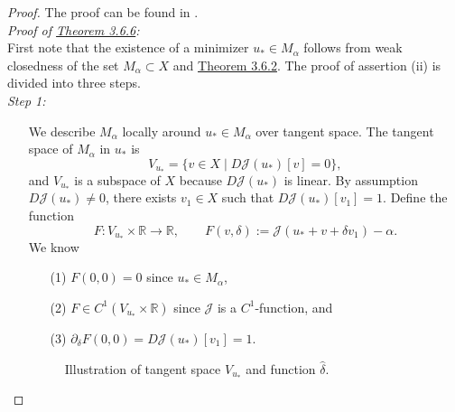 \begin{proof}
The proof can be found in \cite[Kapitel III, III.5 Differentiation nichtlinearer Abbildungen, Satz III.5.4 (e)]{dirk_werner}.\\[11pt]

\textit{Proof of \hyperlink{theorem_3_6_6}{Theorem 3.6.6}:}\\
First note that the existence of a minimizer $u_*\in M_\alpha$ follows from weak closedness of the set $M_\alpha\subset X$ and \hyperlink{theorem_3_6_2}{Theorem 3.6.2}. The proof of assertion (ii) is divided into three steps.\\

\textit{Step 1:}
\begin{itemize}
	\item[] We describe $M_\alpha$ locally around $u_*\in M_\alpha$ over tangent space. The tangent space of $M_\alpha$ in $u_*$ is
	\[V_{u_*}=\{v\in X\mid D\mathcal{J}(u_*)[v]=0\},\]
	and $V_{u_*}$ is a subspace of $X$ because $D\mathcal{J}(u_*)$ is linear. By assumption $D\mathcal{J}(u_*)\ne0$, there exists $v_1\in X$ such that $D\mathcal{J}(u_*)[v_1]=1$. Define the function
	\[F:V_{u_*}\times\mathbb{R}\longrightarrow\mathbb{R},\qquad F(v,\delta):=\mathcal{J}(u_*+v+\delta v_1)-\alpha.\]
	We know
	\begin{itemize}
		\item[(1)] $F(0,0)=0$ since $u_*\in M_\alpha$,
		\item[(2)] $F\in C^1(V_{u_*}\times\mathbb{R})$ since $\mathcal{J}$ is a $C^1$-function, and
		\item[(3)] $\partial_\delta F(0,0)=D\mathcal{J}(u_*)[v_1]=1$.
	\end{itemize}

	\begin{figure}[ht]
		\centering
		\caption{Illustration of tangent space $V_{u_*}$ and function $\hat{\delta}$.}
	\end{figure}


\end{itemize}
\end{proof}
